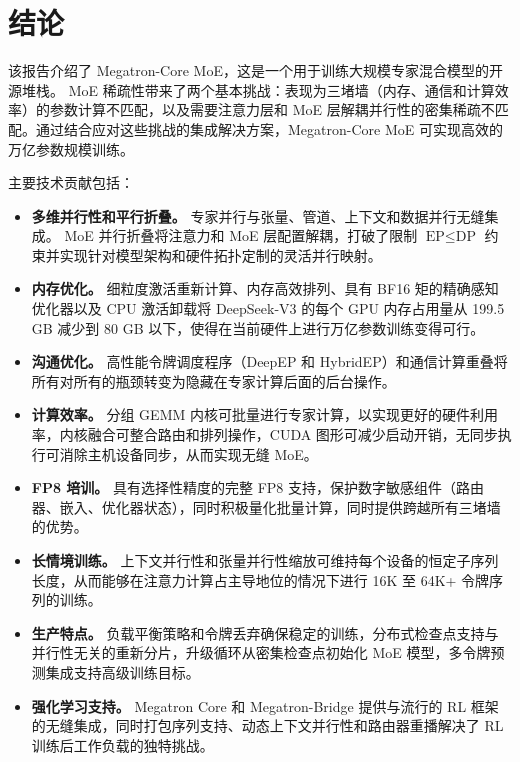 \section{结论}
该报告介绍了 Megatron-Core MoE，这是一个用于训练大规模专家混合模型的开源堆栈。 MoE 稀疏性带来了两个基本挑战：表现为三堵墙（内存、通信和计算效率）的参数计算不匹配，以及需要注意力层和 MoE 层解耦并行性的密集稀疏不匹配。通过结合应对这些挑战的集成解决方案，Megatron-Core MoE 可实现高效的万亿参数规模训练。

主要技术贡献包括：
\begin{itemize}
    \item \textbf{多维并行性和平行折叠。} 专家并行与张量、管道、上下文和数据并行无缝集成。 MoE 并行折叠将注意力和 MoE 层配置解耦，打破了限制 $\text{EP} \leq \text{DP}$ 约束并实现针对模型架构和硬件拓扑定制的灵活并行映射。

    \item \textbf{内存优化。} 细粒度激活重新计算、内存高效排列、具有 BF16 矩的精确感知优化器以及 CPU 激活卸载将 DeepSeek-V3 的每个 GPU 内存占用量从 199.5 GB 减少到 80 GB 以下，使得在当前硬件上进行万亿参数训练变得可行。

    \item \textbf{沟通优化。} 高性能令牌调度程序（DeepEP 和 HybridEP）和通信计算重叠将所有对所有的瓶颈转变为隐藏在专家计算后面的后台操作。

    \item \textbf{计算效率。} 分组 GEMM 内核可批量进行专家计算，以实现更好的硬件利用率，内核融合可整合路由和排列操作，CUDA 图形可减少启动开销，无同步执行可消除主机设备同步，从而实现无缝 MoE。

    \item \textbf{FP8 培训。} 具有选择性精度的完整 FP8 支持，保护数字敏感组件（路由器、嵌入、优化器状态），同时积极量化批量计算，同时提供跨越所有三堵墙的优势。

    \item \textbf{长情境训练。} 上下文并行性和张量并行性缩放可维持每个设备的恒定子序列长度，从而能够在注意力计算占主导地位的情况下进行 16K 至 64K+ 令牌序列的训练。

    \item \textbf{生产特点。} 负载平衡策略和令牌丢弃确保稳定的训练，分布式检查点支持与并行性无关的重新分片，升级循环从密集检查点初始化 MoE 模型，多令牌预测集成支持高级训练目标。

    \item \textbf{强化学习支持。} Megatron Core 和 Megatron-Bridge 提供与流行的 RL 框架的无缝集成，同时打包序列支持、动态上下文并行性和路由器重播解决了 RL 训练后工作负载的独特挑战。
\end{itemize}

